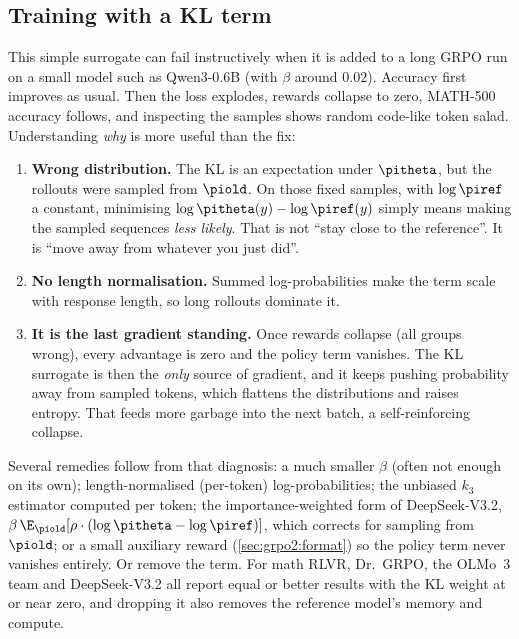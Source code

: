 \subsection{Training with a KL term}\label{sec:grpo2:kltrain}

This simple surrogate can fail instructively when it is added to a long GRPO run on a small
model such as Qwen3-0.6B (with $\beta$ around $0.02$). Accuracy first improves as usual. Then the loss explodes,
rewards collapse to zero, MATH-500 accuracy follows, and inspecting the samples shows random
code-like token salad. Understanding \emph{why} is more useful than the fix:
\begin{enumerate}
\item \textbf{Wrong distribution.} The KL is an expectation under $\pitheta$, but the rollouts
were sampled from $\piold$. On those fixed samples, with $\log\piref$ a constant, minimising
$\log\pitheta(y)-\log\piref(y)$ simply means making the sampled sequences \emph{less likely}.
That is not ``stay close to the reference''. It is ``move away from whatever you just did''.
\item \textbf{No length normalisation.} Summed log-probabilities make the term scale with
response length, so long rollouts dominate it.
\item \textbf{It is the last gradient standing.} Once rewards collapse (all groups wrong),
every advantage is zero and the policy term vanishes. The KL surrogate is then the
\emph{only} source of gradient, and it keeps pushing probability away from sampled tokens,
which flattens the distributions and raises entropy. That feeds more garbage into the next
batch, a self-reinforcing collapse.
\end{enumerate}

Several remedies follow from that diagnosis: a much smaller $\beta$ (often not enough on its own); length-normalised (per-token) log-probabilities; the
unbiased $k_3$ estimator computed per token; the importance-weighted form of DeepSeek-V3.2,
$\beta\,\E_{\piold}[\rho\cdot(\log\pitheta-\log\piref)]$, which corrects for sampling from
$\piold$; or a small auxiliary reward (\cref{sec:grpo2:format}) so the policy term never
vanishes entirely. Or remove the term. For math RLVR, Dr.~GRPO, the OLMo~3 team and
DeepSeek-V3.2 all report equal or better results with the KL weight at or near zero, and
dropping it also removes the reference model's memory and compute.

